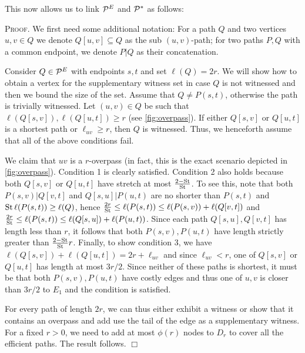 \documentclass[opre,nonblindrev]{informs3} %
\renewenvironment{proof}[1][\textsc{Proof.}]{#1 }{\hfill $\Box$}
\begin{document}
This now allows us to link $\mathcal{P}^E$ and $\mathcal{P}^*$ as follows:
\begin{proof}
We first need some additional notation:
For a path $Q$ and two vertices $u,v\in Q$ we denote $Q[u,v]\subseteq Q$ as the sub $(u,v)$-path; for two paths $P,Q$ with a common endpoint, we denote $P|Q$ as their concatenation.

Consider $Q\in\mathcal{P}^E$ with endpoints $s,t$ and set $\ell(Q)=2r$.
We will show how to obtain a vertex for the supplementary witness set in case $Q$ is not witnessed and then we bound the size of the set.
Assume that $Q\neq P(s,t)$, otherwise the path is trivially witnessed.
Let $(u,v)\in Q$ be such that $\ell(Q[s,v]),\ell(Q[u,t])\geq r$ (see \cref{fig:overpass}). 
If either $Q[s,v]$ or $Q[u,t]$ is a shortest path or $\ell_{uv}\geq r$, then $Q$ is witnessed. Thus, we henceforth assume that all of the above conditions fail.

We claim that $uv$ is a $r$-overpass (in fact, this is the exact scenario depicted in \cref{fig:overpass}).
Condition 1 is clearly satisfied. 
Condition 2 also holds because both $Q[s,v]$ or $Q[u,t]$ have stretch at most $\frac{2-\operatorname{St}}{\operatorname{St}}$.
To see this, note that both $P(s,v)|Q[v,t]$ and $Q[s,u]|P(u,t)$ are no shorter than $P(s,t)$ and $\operatorname{St}\ell(P(s,t))\geq \ell(Q)$, hence
$\frac{2r}{\operatorname{St}}\leq \ell(P(s,t)) \leq  \ell(P(s,v)) + \ell(Q[v,t])$ and $\frac{2r}{\operatorname{St}} \leq \ell(P(s,t)) \leq  \ell(Q[s,u]) + \ell(P(u,t))$.
Since each path $Q[s,u],Q[v,t]$ has length less than $r$, it follows that both $P(s,v),P(u,t)$ have length strictly greater than $\frac{2-\operatorname{St}}{\operatorname{St}}r$. %
Finally, to show condition 3, we have $\ell(Q[s,v])+\ell(Q[u,t])=2r+\ell_{uv}$ and since $\ell_{uv}<r$, one of $Q[s,v]$ or $Q[u,t]$ has length at most $3r/2$.
Since neither of these paths is shortest, it must be that both $P(s,v),P(u,t)$ have costly edges and thus one of $u,v$ is closer than $3r/2$ to $E_1$ and the condition is satisfied.

For every path of length $2r$, we can thus either exhibit a witness or show that it contains an overpass and add use the tail of the edge as a supplementary witness.
For a fixed $r>0$, we need to add at most $\phi(r)$ nodes to $D_r$ to cover all the efficient paths. 
The result follows.
\end{proof}
\end{document}
